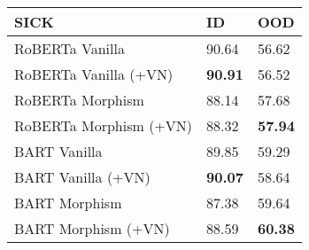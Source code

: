 \begin{tabularx}{1.2\linewidth}{ l *{2}{Z} }
\hline
\textbf{SICK} & \textbf{ID}& \textbf{OOD} \\
\hline
RoBERTa Vanilla  & 90.64 & 56.62 \\
RoBERTa Vanilla (+VN) & \textbf{90.91} & 56.52 \\
RoBERTa Morphism  & 88.14 & 57.68\\
RoBERTa Morphism (+VN) & 88.32 & \textbf{57.94}\\
\hline
BART Vanilla  & 89.85 & 59.29   \\
BART Vanilla (+VN) & \textbf{90.07} & 58.64   \\
BART Morphism  &  87.38 & 59.64   \\
BART Morphism (+VN) &  88.59 & \textbf{60.38}   \\
\hline
\end{tabularx}